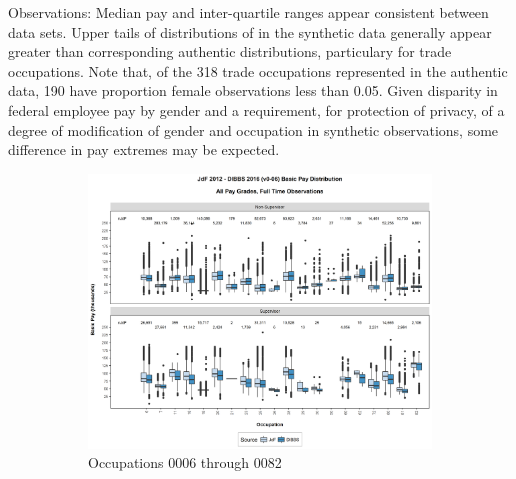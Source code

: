 \documentclass[10pt, letterpaper]{article}
\begin{document}
\begin{spacing}{1.0}
Observations:  Median pay and inter-quartile ranges appear consistent between data sets.  Upper tails of distributions of in the synthetic data generally appear greater than corresponding authentic distributions, particulary for trade occupations.  Note that, of the 318 trade occupations represented in the authentic data, 190 have proportion female observations less than 0.05.  Given disparity in federal employee pay by gender \citep{BoltondeFigGenderPayGap2017} and a requirement, for protection of privacy, of a degree of modification of gender and occupation in synthetic observations, some difference in pay extremes may be expected.\\

\begin{figure}[h]
    \centering
    \begin{subfigure}{1\textwidth}
        \centering
        \includegraphics[width=6in, trim={0 1in 0 0.75in}, clip]{JdFDIBBSBasicPaySupervisoryStatusOccupation1.png}
        \caption{Occupations 0006 through 0082}
        \vspace{10pt}
    \end{subfigure}
    \begin{subfigure}{1\textwidth}
        \centering

\end{subfigure}
\end{figure}
\end{spacing}
\end{document}
